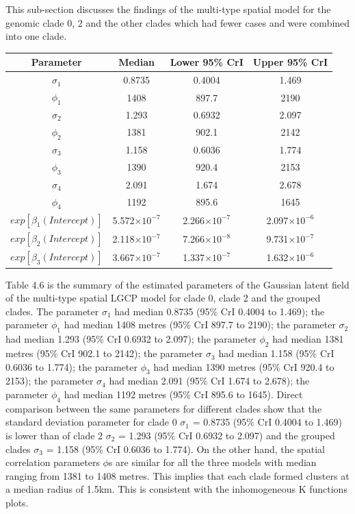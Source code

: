 \documentclass[12pt,a4paper]{report}
\begin{document}
This sub-section discusses the findings of the multi-type spatial model for the genomic clade 0, 2 and the other clades which had fewer cases and were combined into one clade.\\

\begin{table}[h]
    \centering
    \begin{tabular}{cccc}
         \toprule
         Parameter & Median & Lower 95\% CrI & Upper 95\% CrI \\ \midrule
        $\sigma_1$ & 0.8735 & 0.4004 & 1.469 \\
        $\phi_1$ & 1408 & 897.7 & 2190 \\
        $\sigma_2$ & 1.293 & 0.6932 & 2.097 \\
        $\phi_2$ & 1381 & 902.1 & 2142 \\
        $\sigma_3$ & 1.158 & 0.6036 & 1.774 \\
        $\phi_3$ & 1390 & 920.4 & 2153 \\
        $\sigma_4$ & 2.091 & 1.674 & 2.678 \\
        $\phi_4$ & 1192 & 895.6 & 1645 \\
        $exp[\beta_1(Intercept)]$ & 5.572$\times10^{-7}$ & 2.266$\times10^{-7}$ & 2.097$\times10^{-6}$ \\
        $exp[\beta_2(Intercept)]$ & 2.118$\times10^{-7}$ & 7.266$\times10^{-8}$ & 9.731$\times10^{-7}$ \\
        $exp[\beta_3(Intercept)]$ & 3.667$\times10^{-7}$ & 1.337$\times10^{-7}$ & 1.632$\times10^{-6}$ \\
         \bottomrule
    \end{tabular}
\end{table}

Table 4.6 is the summary of the estimated parameters of the Gaussian latent field of the multi-type spatial LGCP model for clade 0, clade 2 and the grouped clades. The parameter $\sigma_1$ had median 0.8735 (95\% CrI 0.4004 to 1.469); the parameter $\phi_1$ had median 1408 metres (95\% CrI 897.7 to 2190); the parameter $\sigma_2$ had median 1.293 (95\% CrI 0.6932 to 2.097); the parameter $\phi_2$ had median 1381 metres (95\% CrI 902.1 to 2142); the parameter $\sigma_3$ had median 1.158 (95\% CrI 0.6036 to 1.774); the parameter $\phi_3$ had median 1390 metres (95\% CrI 920.4 to 2153); the parameter $\sigma_4$ had median 2.091 (95\% CrI 1.674 to 2.678); the parameter $\phi_4$ had median 1192 metres (95\% CrI 895.6 to 1645). Direct comparison between the same parameters for different clades show that the standard deviation parameter for clade 0 $\sigma_1$ = 0.8735 (95\% CrI 0.4004 to 1.469) is lower than of clade 2 $\sigma_2$ = 1.293 (95\% CrI 0.6932 to 2.097) and the grouped clades $\sigma_3$ = 1.158 (95\% CrI 0.6036 to 1.774). On the other hand, the spatial correlation parameters $\phi$s are similar for all the three models with median ranging from 1381 to 1408 metres. This implies that each clade formed clusters at a median radius of 1.5km. This is consistent with the inhomogeneous K functions plots.
\end{document}
